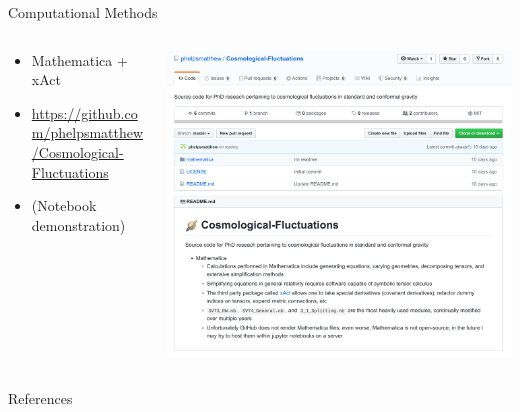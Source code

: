 \documentclass[8pt,aspectratio=1610]{beamer}
\begin{document}
\begin{frame}{Computational Methods}
	\begin{columns}
		\begin{column}{0.5\linewidth}
			\begin{itemize}
				\item Mathematica + xAct
				\item \url{https://github.com/phelpsmatthew/Cosmological-Fluctuations}
				\item (Notebook demonstration)
			\end{itemize}
		\end{column}
		\begin{column}{0.6\linewidth}
			\includegraphics[width=\linewidth]{github.png}
		\end{column}
	\end{columns}
\end{frame}


\begin{frame}{References}
		
\end{frame}

\end{document}
